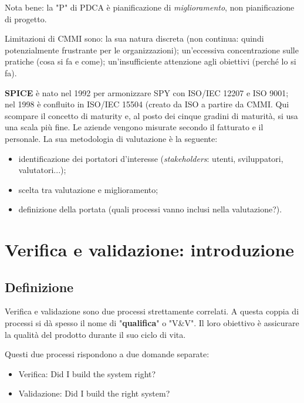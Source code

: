 \documentclass[a4paper]{article}
\begin{document}
		
Nota bene: la "P" di PDCA è pianificazione di \emph{miglioramento}, non pianificazione di progetto.
		
Limitazioni di CMMI sono: la sua natura discreta (non continua: quindi potenzialmente frustrante per le organizzazioni); un'eccessiva concentrazione sulle pratiche (cosa si fa e come); un'insufficiente attenzione agli obiettivi (perché lo si fa).
		
\textbf{SPICE} è nato nel 1992 per armonizzare SPY con ISO/IEC 12207 e ISO 9001; nel 1998 è confluito in ISO/IEC 15504 (creato da ISO a partire da CMMI. Qui scompare il concetto di maturity e, al posto dei cinque gradini di maturità, si usa una scala più fine. Le aziende vengono misurate secondo il fatturato e il personale. La sua metodologia di valutazione è la seguente:
		
	\begin{itemize}
		
			
	\item identificazione dei portatori d'interesse (\emph{stakeholders}: utenti, sviluppatori, valutatori...);
			
	\item scelta tra valutazione e miglioramento;%

			
	\item definizione della portata (quali processi vanno inclusi nella valutazione?).
		
	\end{itemize}

	


		
	\section{Verifica e validazione: introduzione}


		
	\subsection{Definizione}

		
Verifica e validazione sono due processi strettamente correlati. A questa coppia di processi si dà spesso il nome di "\textbf{qualifica}" o "V\&{}V". Il loro obiettivo è assicurare la qualità del prodotto durante il suo ciclo di vita.
		
Questi due processi rispondono a due domande separate:
		
	\begin{itemize}
		
			
	\item Verifica: Did I build the system right?
			
	\item Validazione: Did I build the right system?
		
	\end{itemize}
\end{document}
